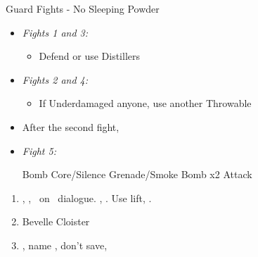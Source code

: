 \begin{battle}{Guard Fights - No Sleeping Powder}
	\begin{itemize}
		\item \textit{Fights 1 and 3:}
		      \begin{itemize}
			      \tidusf Attack
			      \item Defend or use Distillers
		      \end{itemize}
		\item \textit{Fights 2 and 4:}
		      \begin{itemize}
			      \switch{\tidus}{\kimahri}
			      \kimahrif Bomb Core/Silence Grenade/Smoke Bomb
			      \switch{\rikku}{\tidus}
			      \tidusf Attack
			      \kimahrif Repeat
			      \item If Underdamaged anyone, use another Throwable
		      \end{itemize}
		\item After the second fight, \formation{\tidus}{\rikku}{\lulu}
		\item \textit{Fight 5:}
		      \begin{itemize}
			      \switch{\tidus}{\rikku}
			      \rikkuf Bomb Core/Silence Grenade/Smoke Bomb x2
			      \switch{\kimahri}{\tidus}
			      \tidusf Attack
		      \end{itemize}
	\end{itemize}
\end{battle}
\begin{enumerate}[resume]
	\item \sd, \skippablefmv[1:30], \sd\ on \yuna\ dialogue. \skippablefmv[30], \sd. Use lift, \sd.
	\item Bevelle Cloister
	\item \sd, name \bahamut, don't save, \sd
\end{enumerate}
\newpage
